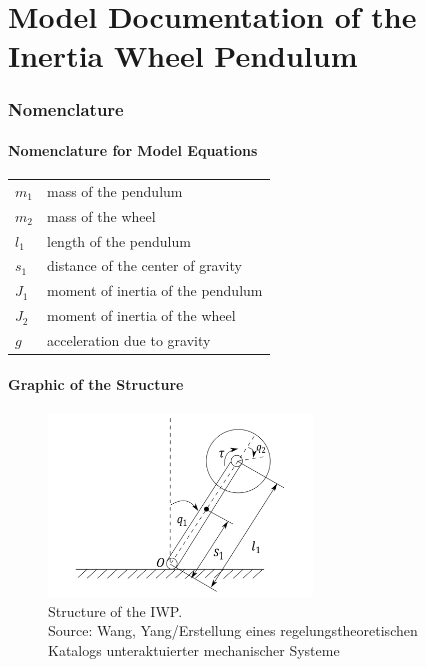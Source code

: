 \documentclass[10pt,a4paper]{article}
\begin{document}
	\part*{Model Documentation of the \\ Inertia Wheel Pendulum} %
	
	
	\section{Nomenclature} %
	\subsection{Nomenclature for Model Equations} %
	
	\begin{tabular}{ll}
		$m_1$ & mass of the pendulum \\
		$m_2$ & mass of the wheel \\
		$l_1$ & length of the pendulum \\
		$s_1$ & distance of the center of gravity \\
		$J_1$ & moment of inertia of the pendulum \\
		$J_2$ & moment of inertia of the wheel \\		
		$g$ & acceleration due to gravity \\
		
				
	\end{tabular}
	 
	
	\subsection{Graphic of the Structure}	
	\begin{figure}[H]
		\centering
		\captionsetup{justification=centering, margin=1cm}
		\includegraphics[width=70mm]{iwp.pdf}
		\caption{Structure of the IWP. \\ \footnotesize{Source: Wang, Yang/Erstellung eines regelungstheoretischen Katalogs unteraktuierter mechanischer Systeme}}
	\end{figure}
	
\end{document}
